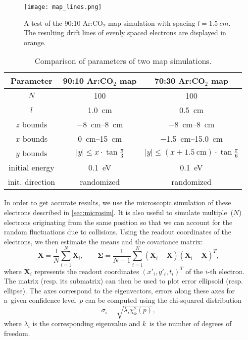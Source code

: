 		\begin{figure}
			\centering
			\texttt{[image: map\_lines.png]}
			\caption{A test of the 90:10 Ar:CO$_2$ map simulation with spacing $l = \qty{1.5}{cm}$. The resulting drift lines of evenly spaced electrons are displayed in orange.}
			\label{fig:maplines}
		\end{figure}
		
		\begin{table}
			\centering
			\caption{Comparison of parameters of two map simulations.}
			{\renewcommand{\arraystretch}{1.2}
			\begin{tabular}{|c|c|c|}
				\hline
				\textbf{Parameter} & \textbf{90:10 Ar:CO$_2$ map} & \textbf{70:30 Ar:CO$_2$ map}\\
				\hline
				$N$ & 100 & 100 \\
				\hline
				$l$ & \qty{1.0}{\centi\meter} & \qty{0.5}{\centi\meter} \\
				\hline
				$z$ bounds & \qtyrange{-8}{8}{\centi\meter} & \qtyrange{-8}{8}{\centi\meter} \\
				\hline
				$x$ bounds & \qtyrange{0}{15}{\centi\meter} & \qtyrange{-1.5}{15.0}{\centi\meter} \\
				\hline
				$y$ bounds & $|y| \leq x\cdot\tan\frac{\pi}{3}$ & $|y| \leq \left(x+\qty{1.5}{\centi\meter}\right)\cdot\tan\frac{\pi}{6}$ \\
				\hline
				initial energy & \qty{0.1}{\eV} & \qty{0.1}{\eV} \\
				\hline
				init. direction & randomized & randomized \\
				\hline
			\end{tabular}}
			\label{tab:map}
		\end{table}
		
		In order to get accurate results, we use the microscopic simulation of these electrons described in \cref{sec:microsim}. It is also useful to simulate multiple~($N$) electrons originating from the same position so that we can account for the random fluctuations due to collisions. Using the readout coordinates of the electrons, we then estimate the means and the covariance matrix:
			\begin{equation}
				\label{eq:cov}
				\mathbf{\overline{X}} = \frac{1}{N}\sum_{i=1}^{N} \mathbf{X}_i,\qquad \mathbf{\Sigma} = \frac{1}{N-1}\sum_{i=1}^{N}(\mathbf{X}_i-\mathbf{\overline{X}})(\mathbf{X}_i-\mathbf{\overline{X}})^T,
			\end{equation}
		where $\mathbf{X}_i$ represents the readout coordinates $(x'_i, y'_i, t_i)^T$ of the $i$\nobreakdash-th electron. The matrix (resp. its submatrix) can then be used to plot error ellipsoid (resp. ellipse). The axes correspond to the eigenvectors, errors along these axes for a~given confidence level~$p$ can be computed using the chi\nobreakdash-squared distribution
			\begin{equation}
				\label{eq:sigma}
				\sigma_i = \sqrt{\lambda_i \chi^2_k(p)},
			\end{equation}
		where $\lambda_i$ is the corresponding eigenvalue and $k$~is the number of degrees of freedom.
		
